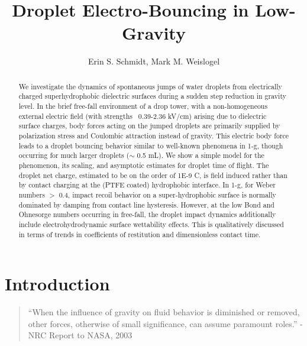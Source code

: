 \documentclass[10pt,a4paper]{article}
\title{\textsf{\textbf{Droplet Electro-Bouncing in Low-Gravity}}}
\author{Erin S. Schmidt, Mark M. Weislogel}
\date{}
\begin{document}
\maketitle
\doublespacing

\begin{abstract}
\noindent
We investigate the dynamics of spontaneous jumps of water droplets from electrically charged superhydrophobic dielectric surfaces during a sudden step reduction in gravity level. In the brief free-fall environment of a drop tower, with a non-homogeneous external electric field (with strengths ~0.39-2.36 kV/cm) arising due to dielectric surface charges, body forces acting on the jumped droplets are primarily supplied by polarization stress and Coulombic attraction instead of gravity. This electric body force leads to a droplet bouncing behavior similar to well-known phenomena in 1-g, though occurring for much larger droplets ($\sim$ 0.5 mL). We show a simple model for the phenomenon, its scaling, and asymptotic estimates for droplet time of flight. The droplet net charge, estimated to be on the order of 1E-9 C, is field induced rather than by contact charging at the (PTFE coated) hydrophobic interface. In 1-g, for Weber numbers $>$ 0.4, impact recoil behavior on a super-hydrophobic surface is normally dominated by damping from contact line hysteresis. However, at the low Bond and Ohnesorge numbers occurring in free-fall, the droplet impact dynamics additionally include electrohydrodynamic surface wettability effects. This is qualitatively discussed in terms of trends in coefficients of restitution and dimensionless contact time.
\end{abstract}

\newpage
\section{Introduction}
\begin{quote}
``When the influence of gravity on fluid behavior is diminished or removed, other forces, otherwise of small significance, can assume paramount roles.''
- NRC Report to NASA, 2003  \cite{motil_priorities_2012}
\end{quote}
\end{document}
